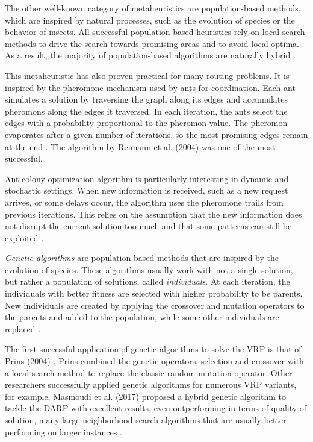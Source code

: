 \vspace{0.5cm}

The other well-known category of metaheuristics are population-based methods, which are inspired by natural processes, such as the evolution of species or the behavior of insects. All successful population-based heuristics rely on local search methods to drive the search towards promising areas and to avoid local optima. As a result, the majority of population-based algorithms are naturally hybrid \cite{toth2015vrp}.


This metaheuristic has also proven practical for many routing problems. It is inspired by the pheromone mechanism used by ants for coordination. Each ant simulates a solution by traversing the graph along its edges and accumulates pheromons along the edges it traversed. In each iteration, the ants select the edges with a probability proportional to the pheromon value. The pheromon evaporates after a given number of iterations, so the most promising edges remain at the end \cite{Bono2020, Solnon2010}. The algorithm by Reimann et al. (2004) \cite{Reimann2004} was one of the most successful.

Ant colony optimization algorithm is particularly interesting in dynamic and stochastic settings. When new information is received, such as a new request arrives, or some delays occur, the algorithm uses the pheromone trails from previous iterations. This relies on the assumption that the new information does not disrupt the current solution too much and that some patterns can still be exploited \cite{Schyns2015, Bono2020}.


\emph{Genetic algorithms} are population-based methods that are inspired by the evolution of species. These algorithms usually work with not a single solution, but rather a population of solutions, called \emph{individuals}. At each iteration, the individuals with better fitness are selected with higher probability to be parents. New individuals are created by applying the crossover and mutation operators to the parents and added to the population, while some other individuals are replaced \cite{Bono2020, darp-survey}.

The first successful application of genetic algorithms to solve the VRP is that of Prins (2004) \cite{Prins2004}. Prins combined the genetic operators, selection and crossover with a local search method to replace the classic random mutation operator. Other researchers successfully applied genetic algorithms for numerous VRP variants, for example, Masmoudi et al. (2017) \cite{Masmoudi2017} proposed a hybrid genetic algorithm to tackle the DARP with excellent results, even outperforming in terms of quality of solution, many large neighborhood search algorithms that are usually better performing on larger instances \cite{darp-survey}.

